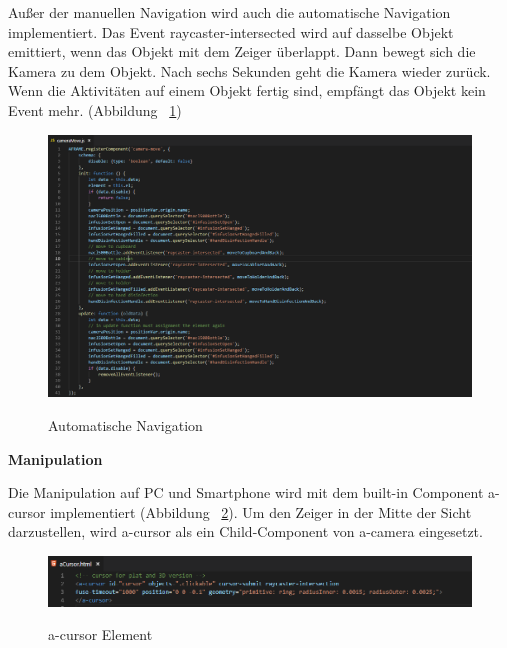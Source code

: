   Außer der manuellen Navigation wird auch die automatische Navigation implementiert. Das Event {\selectfont raycaster-intersected} wird auf dasselbe Objekt emittiert, wenn das Objekt mit dem Zeiger überlappt. Dann bewegt sich die Kamera zu dem Objekt. Nach sechs Sekunden geht die Kamera wieder zurück. Wenn die Aktivitäten auf einem Objekt fertig sind, empfängt das Objekt kein Event mehr. (Abbildung ~\ref{fig:cameraMove})
  
\begin{figure}[ht]
\vspace*{1em}
\centering
\caption[Automatische Navigation]{Automatische Navigation}
\includegraphics[width=\textwidth]{images/cameraMove.png}
\label{fig:cameraMove} 
\end{figure}
  
  \textbf{Manipulation}
  
  Die Manipulation auf PC und Smartphone wird mit dem built-in Component {\selectfont a-cursor} implementiert (Abbildung ~\ref{fig:aCursorElement}). Um den Zeiger in der Mitte der Sicht darzustellen, wird {\selectfont a-cursor} als ein Child-Component von {\selectfont a-camera} eingesetzt.
  
 \begin{figure}[ht]
\vspace*{1em}
\centering
\caption[a-cursor Element]{a-cursor Element}
\includegraphics[width=\textwidth]{images/aCursorElement.png}
\label{fig:aCursorElement} 
\end{figure}
  
